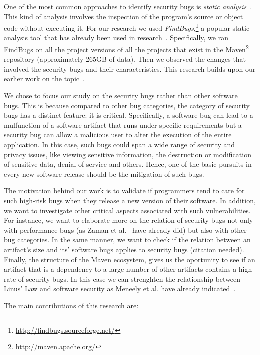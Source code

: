 \documentclass[conference]{IEEEtran}
\begin{document}
One of the most common approaches to identify security bugs is
{\it static analysis}~\cite{CW07}. This kind of analysis involves the
inspection of the program's source or object code without executing
it. For our research we used {\it FindBugs},\footnote{\url{http://findbugs.sourceforge.net/}}
a popular static analysis tool that has already been used in
research~\cite{AP10, HP07, HP04}. Specifically, we ran FindBugs on all the project
versions of all the projects that exist in the Maven\footnote{\url{http://maven.apache.org/}}
repository (approximately 265GB of data). Then we observed the changes that
involved the security bugs and their characteristics. This research builds upon
our earlier work on the topic~\cite{MGS12}.

We chose to focus our study on the security bugs rather than other
software bugs. This is because compared to other bug categories,
the category of security bugs has a distinct feature: it is critical. Specifically, a software bug can
lead to a mulfunction of a software artifact that runs under specific
requirements but a security bug can allow a malicious user to alter the
execution of the entire application. In this case, such bugs could span a wide range
of security and privacy issues, like viewing sensitive information, the destruction or
modification of sensitive data, denial of service and others.
Hence, one of the basic pursuits in every new software release should be the
mitigation of such bugs.

The motivation behind our work is to validate if programmers tend to care for
such high-risk bugs when they release a new version of their software. In
addition, we want to investigate other critical aspects associated with such
vulnerabilities. For instance, we want to elaborate more on the relation of security
bugs not only with performance bugs (as Zaman et al.~\cite{ZAH11} have already
did) but also with other bug categories. In the same manner, we want to check
if the relation between an artifact's size and its' software bugs applies 
to security bugs (citation needed). Finally, the structure of the Maven ecosystem,
gives us the oportunity to see if an artifact that is a dependency to a large
number of other artifacts contains a high rate of security bugs. In this case
we can strenghten the relationship between Linus' Law and software security as
Meneely et al. have already indicated~\cite{MW10}.

The main contributions of this research are:
\end{document}

